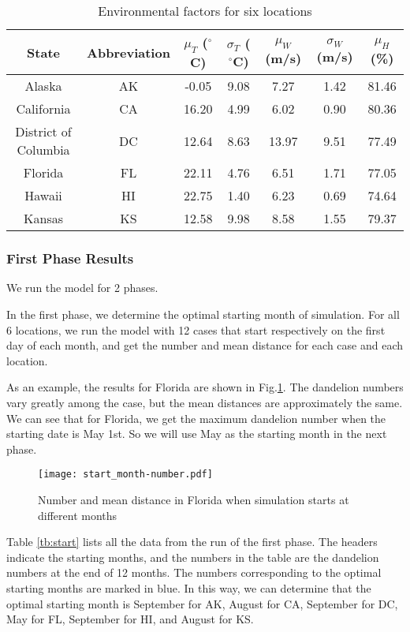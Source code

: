 \documentclass[12pt]{article}
\begin{document}
			{
				\fontsize{10}{14}\selectfont
				{
					\begin{longtable}{ccccccc}
						\caption{Environmental factors for six locations\autocite{USA}}
						\label{tb:locs}\\
						\toprule
						State&Abbreviation&$\mu_T$ ($^\circ$C)&$\sigma_T$ ($^\circ$C)&$\mu_W$ (m/s)&$\sigma_W$ (m/s)&$\mu_H$ (\%)\\
						\toprule
						Alaska&AK&-0.05&9.08&7.27&1.42&81.46\\
						California&CA&16.20&4.99&6.02&0.90&80.36\\
						District of Columbia&DC&12.64&8.63&13.97&9.51&77.49\\
						Florida&FL&22.11&4.76&6.51&1.71&77.05\\
						Hawaii&HI&22.75&1.40&6.23&0.69&74.64\\
						Kansas&KS&12.58&9.98&8.58&1.55&79.37\\
						\bottomrule
					\end{longtable}
				}
			}
			\newpage
			
		\subsubsection{First Phase Results}	
			We run the model for 2 phases.
			
			In the first phase, we determine the optimal starting month of simulation.  For all 6 locations, we run the model with 12 cases that start respectively on the first day of each month, and get the number and mean distance for each case and each location.
			
			As an example, the results for Florida are shown in Fig.\ref{fig:start}.  The dandelion numbers vary greatly among the case, but the mean distances are approximately the same.  We can see that for Florida, we get the maximum dandelion number when the starting date is May 1st.  So we will use May as the starting month in the next phase.
			
			\begin{figure}[htbp]
				\centering
				\texttt{[image: start\_month-number.pdf]}
				\caption{Number and mean distance in Florida when simulation starts at different months}
				\label{fig:start}
			\end{figure}
			
			Table \ref{tb:start} lists all the data from the run of the first phase.  The headers indicate the starting months, and the numbers in the table are the dandelion numbers at the end of 12 months.  The numbers corresponding to the optimal starting months are marked in blue.  In this way, we can determine that the optimal starting month is September for AK, August for CA, September for DC, May for FL, September for HI, and August for KS.
			
\end{document}
